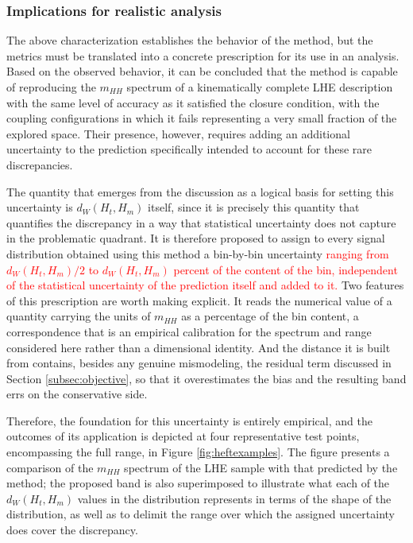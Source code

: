 
\subsubsection{Implications for realistic analysis}
\label{subsec:uncertainties}
%
The above characterization establishes the behavior of the method, but the metrics must be translated into a concrete prescription for its use in an analysis. Based on the observed behavior, it can be concluded that the method is capable of reproducing the $m_{HH}$ spectrum of a kinematically complete LHE description with the same level of accuracy as it satisfied the closure condition, with the coupling configurations in which it fails representing a very small fraction of the explored space. Their presence, however, requires adding an additional uncertainty to the prediction specifically intended to account for these rare discrepancies.

The quantity that emerges from the discussion as a logical basis for setting this uncertainty is $d_W(H_{t},H_{m})$ itself, since it is precisely this quantity that quantifies the discrepancy in a way that statistical uncertainty does not capture in the problematic quadrant. It is therefore proposed to assign to every signal distribution obtained using this method a bin-by-bin uncertainty \textcolor{red}{ranging from $d_W(H_{t},H_{m})/2$ to $d_W(H_{t},H_{m})$ percent of the content of the bin, independent of the statistical uncertainty of the prediction itself and added to it.} Two features of this prescription are worth making explicit. It reads the numerical value of a quantity carrying the units of $m_{HH}$ as a percentage of the bin content, a correspondence that is an empirical calibration for the spectrum and range considered here rather than a dimensional identity. And the distance it is built from contains, besides any genuine mismodeling, the residual term discussed in Section \ref{subsec:objective}, so that it overestimates the bias and the resulting band errs on the conservative side.\medskip

Therefore, the foundation for this uncertainty is entirely empirical, and the outcomes of its application is depicted at four representative test points, encompassing the full range, in Figure \ref{fig:heftexamples}. The figure presents a comparison of the $m_{HH}$ spectrum of the LHE sample with that predicted by the method; the proposed band is also superimposed to illustrate what each of the $d_W(H_{t},H_{m})$ values in the distribution represents in terms of the shape of the distribution, as well as to delimit the range over which the assigned uncertainty does cover the discrepancy.

